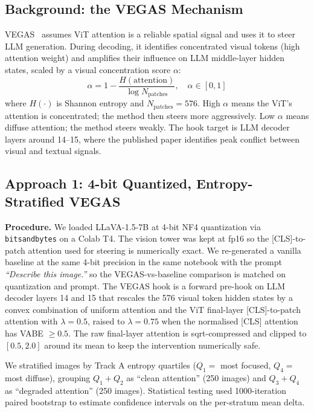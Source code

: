 \documentclass[11pt]{article}
\begin{document}
\subsection{Background: the VEGAS Mechanism}

VEGAS~\cite{seo2024vegas} assumes ViT attention is a reliable spatial signal and uses
it to steer LLM generation. During decoding, it identifies concentrated visual tokens
(high attention weight) and amplifies their influence on LLM middle-layer hidden states,
scaled by a visual concentration score $\alpha$:
\begin{equation}
  \alpha = 1 - \frac{H(\mathrm{attention})}{\log N_{\mathrm{patches}}},
  \quad \alpha \in [0, 1]
\end{equation}
where $H(\cdot)$ is Shannon entropy and $N_{\mathrm{patches}} = 576$. High $\alpha$
means the ViT's attention is concentrated; the method then steers more aggressively.
Low $\alpha$ means diffuse attention; the method steers weakly. The hook target is LLM
decoder layers around 14--15, where the published paper identifies peak conflict between
visual and textual signals.

\subsection{Approach 1: 4-bit Quantized, Entropy-Stratified VEGAS}

\textbf{Procedure.} We loaded LLaVA-1.5-7B at 4-bit NF4 quantization via
\texttt{bitsandbytes} on a Colab T4. The vision tower was kept at fp16 so the
[CLS]-to-patch attention used for steering is numerically exact. We re-generated a
vanilla baseline at the same 4-bit precision in the same notebook with the prompt
\textit{``Describe this image.''} so the VEGAS-vs-baseline comparison is matched on
quantization and prompt. The VEGAS hook is a forward pre-hook on LLM decoder layers 14
and 15 that rescales the 576 visual token hidden states by a convex combination of
uniform attention and the ViT final-layer [CLS]-to-patch attention with $\lambda = 0.5$,
raised to $\lambda = 0.75$ when the normalised [CLS] attention has VABE $\geq 0.5$. The
raw final-layer attention is sqrt-compressed and clipped to $[0.5, 2.0]$ around its
mean to keep the intervention numerically safe.

We stratified images by Track A entropy quartiles ($Q_1 =$ most focused,
$Q_4 =$ most diffuse), grouping $Q_1 + Q_2$ as ``clean attention'' (250 images) and
$Q_3 + Q_4$ as ``degraded attention'' (250 images). Statistical testing used
1000-iteration paired bootstrap to estimate confidence intervals on the per-stratum
mean delta.
\end{document}
